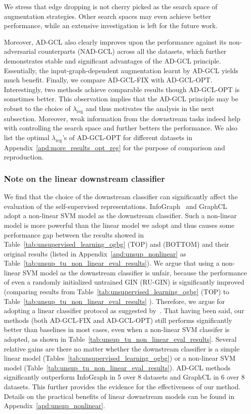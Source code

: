We stress that edge dropping is not cherry picked as the search space of augmentation strategies. Other search spaces may even achieve better performance, while an extensive investigation is left for the future work. 

Moreover, AD-GCL also clearly improves upon the performance against its non-adversarial counterparts (NAD-GCL) across all the datasets, which further demonstrates stable and significant advantages of the AD-GCL principle. Essentially, the input-graph-dependent augmentation learnt by AD-GCL yields much benefit.
Finally, we compare AD-GCL-FIX with AD-GCL-OPT. %
Interestingly, two methods achieve comparable results though AD-GCL-OPT is sometimes better. This observation implies that the AD-GCL principle may be robust to the choice of $\lambda_{\text{reg}}$ and thus motivates the analysis in the next subsection. Moreover, weak information from the downstream tasks indeed help with controlling the search space and further betters the performance. We also list the optimal $\lambda_{\text{reg}}$'s of AD-GCL-OPT for different datasets in Appendix~\ref{apd:more_results_opt_reg} for the purpose of comparison and reproduction.
\subsubsection{Note on the linear downstream classifier}
We find that the choice of the downstream classifier can significantly affect the evaluation of the self-supervised representations. InfoGraph~\cite{sun2019infograph} and GraphCL~\cite{you2020graph} adopt a non-linear SVM model as the downstream classifier. Such a non-linear model is more powerful than the linear model we adopt and thus causes some performance gap between the results showed in Table~\ref{tab:unsupervised_learning_ogbg} (TOP) and (BOTTOM) and their original results (listed in Appendix~\ref{apd:unsup_nonlinear} as Table~\ref{tab:unsup_tu_non_linear_eval_results}). We argue that using a non-linear SVM model as the downstream classifier is unfair, because the performance of even a randomly initialized untrained GIN (RU-GIN) is significantly improved  (comparing results from Table~\ref{tab:unsupervised_learning_ogbg} (TOP) to Table~\ref{tab:unsup_tu_non_linear_eval_results} ). Therefore, we argue for adopting a linear classifier protocol as suggested by~\cite{tschannen2019mutual}.
That having been said, our methods (both AD-GCL-FIX and AD-GCL-OPT) still performs significantly better than baselines in most cases, even when a non-linear SVM classifer is adopted, as shown in Table~\ref{tab:unsup_tu_non_linear_eval_results}. Several relative gains are there no matter whether the downstream classifier is a simple linear model (Tables~\ref{tab:unsupervised_learning_ogbg}) or a non-linear SVM model (Table~\ref{tab:unsup_tu_non_linear_eval_results}). AD-GCL methods significantly outperform InfoGraph in 5 over 8 datasets and GraphCL in 6 over 8 datasets. This further provides the evidence for the effectiveness of our method. Details on the practical benefits of linear downstream models can be found in Appendix~\ref{apd:unsup_nonlinear}.


